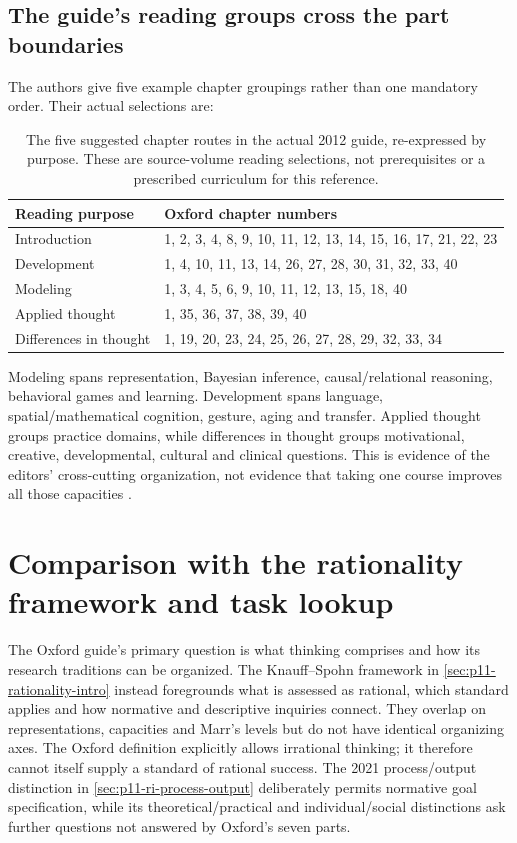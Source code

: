 \subsection{The guide's reading groups cross the part boundaries}

The authors give five example chapter groupings rather than one mandatory
order. Their actual selections are:
\begin{table}[htbp]
\centering\small
\begin{tabular}{p{}p{}}
Reading purpose & Oxford chapter numbers\\ \hline
Introduction &1, 2, 3, 4, 8, 9, 10, 11, 12, 13, 14, 15, 16, 17, 21, 22, 23\\
Development &1, 4, 10, 11, 13, 14, 26, 27, 28, 30, 31, 32, 33, 40\\
Modeling &1, 3, 4, 5, 6, 9, 10, 11, 12, 13, 15, 18, 40\\
Applied thought &1, 35, 36, 37, 38, 39, 40\\
Differences in thought &1, 19, 20, 23, 24, 25, 26, 27, 28, 29, 32, 33, 34
\end{tabular}
\caption{The five suggested chapter routes in the actual 2012 guide,
re-expressed by purpose. These are source-volume reading selections, not
prerequisites or a prescribed curriculum for this reference.}
\label{tab:p11-ohtr1-reading-routes}
\end{table}

Modeling spans representation, Bayesian inference, causal/relational
reasoning, behavioral games and learning. Development spans language,
spatial/mathematical cognition, gesture, aging and transfer. Applied thought
groups practice domains, while differences in thought groups motivational,
creative, developmental, cultural and clinical questions. This is evidence
of the editors' cross-cutting organization, not evidence that taking one
course improves all those capacities
\parencite[pp.~6--7]{HolyoakMorrison2012ReadersGuide}.

\section{Comparison with the rationality framework and task lookup}
\label{sec:p11-ohtr1-comparison}

The Oxford guide's primary question is what thinking comprises and how its
research traditions can be organized. The Knauff--Spohn framework in
\cref{sec:p11-rationality-intro} instead foregrounds what is assessed as
rational, which standard applies and how normative and descriptive inquiries
connect. They overlap on representations, capacities and Marr's levels but
do not have identical organizing axes. The Oxford definition explicitly
allows irrational thinking; it therefore cannot itself supply a standard
of rational success. The 2021 process/output distinction in
\cref{sec:p11-ri-process-output} deliberately permits normative goal
specification, while its theoretical/practical and individual/social
distinctions ask further questions not answered by Oxford's seven parts.


